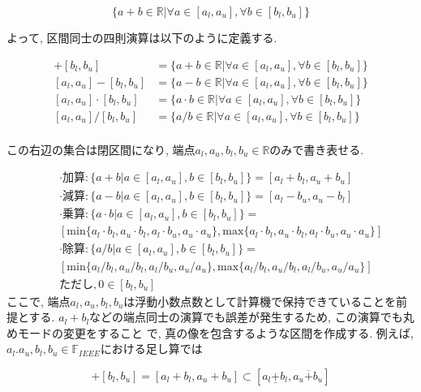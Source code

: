 \documentclass[11pt,a4paper]{jsreport}
\theoremstyle{definition}
\begin{document}
\begin{equation*}
\{a + b \in \mathbb{R} | \forall{a} \in [a_l,a_u],\forall{b} \in [b_l,b_u]\}
\end{equation*}

  よって, 区間同士の四則演算は以下のように定義する.

\begin{align*}
[a_l,a_u] + [b_l,b_u] &= \{a + b \in \mathbb{R} | \forall{a} \in [a_l,a_u],\forall{b} \in [b_l,b_u]\} \\
[a_l,a_u] - [b_l,b_u] &= \{a - b \in \mathbb{R} | \forall{a} \in [a_l,a_u],\forall{b} \in [b_l,b_u]\} \\
[a_l,a_u] \cdot [b_l,b_u] &= \{a \cdot b \in \mathbb{R} | \forall{a} \in [a_l,a_u],\forall{b} \in [b_l,b_u]\} \\
[a_l,a_u] / [b_l,b_u] &= \{a / b \in \mathbb{R} | \forall{a} \in [a_l,a_u],\forall{b} \in [b_l,b_u]\} \\
\end{align*}

この右辺の集合は閉区間になり, 端点$a_l,a_u,b_l,b_u \in \mathbb{R}$のみで書き表せる.

\begin{align*}
&\cdot\text{加算}: \{a + b|a \in [a_l,a_u],b \in [b_l,b_u]\} = [a_l + b_l,a_u + b_u]  \\
&\cdot\text{減算}: \{a - b|a \in [a_l,a_u],b \in [b_l,b_u]\} = [a_l - b_u,a_u - b_l]  \\
&\cdot\text{乗算}: \{a \cdot b|a \in [a_l,a_u],b \in [b_l,b_u]\} = \\
  \quad &[\text{min}\{a_l \cdot b_l,a_u \cdot b_l,a_l \cdot b_u,a_u \cdot a_u\},\text{max}\{a_l \cdot b_l,a_u \cdot b_l,a_l \cdot b_u,a_u \cdot a_u\}]  \\
&\cdot\text{除算}: \{a/b|a \in [a_l,a_u],b \in [b_l,b_u]\} = \\
  \quad &[\text{min}\{a_l/b_l,a_u/b_l,a_l/b_u,a_u/a_u\}, \text{max}\{a_l/b_l,a_u/b_l,a_l/b_u,a_u/a_u\}]  \\
&ただし,0 \in [b_l,b_u]
\end{align*}
  ここで, 端点$a_l,a_u,b_l,b_u$は浮動小数点数として計算機で保持できていることを前提とする.
$a_l + b_l$などの端点同士の演算でも誤差が発生するため, この演算でも丸めモードの変更をすること
で, 真の像を包含するような区間を作成する. 例えば, $a_l.a_u,b_l,b_u \in \mathbb{F}_{IEEE}$における足し算では

\begin{equation*}
[a_l,a_u] + [b_l,b_u] = [a_l + b_l,a_u + b_u] \subset [a_l \underline{+} b_l,a_u \overline{+} b_u]
\end{equation*}
\end{document}
